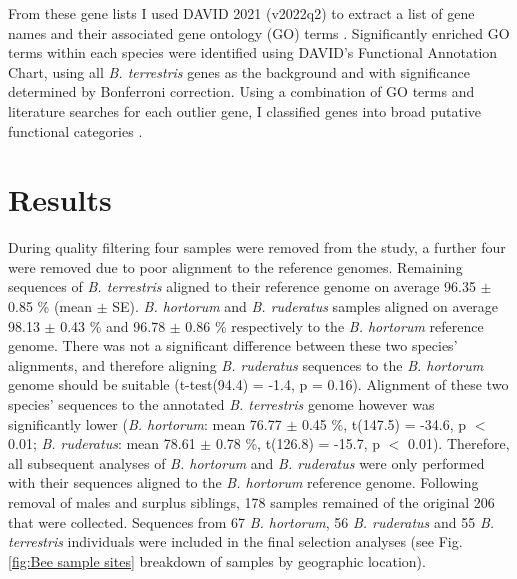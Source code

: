 \documentclass[12pt]{article}
\begin{document}
\begin{linenumbers}
		From these gene lists I used DAVID 2021 (v2022q2) to extract a list of gene names and their associated gene ontology (GO) terms \citep{huang_systematic_2009, sherman_david_2022}. Significantly enriched GO terms within each species were identified using DAVID's Functional Annotation Chart, using all \emph{B. terrestris} genes as the background and with significance determined by Bonferroni correction. Using a combination of GO terms and literature searches for each outlier gene, I classified genes into broad putative functional categories \citep{ashburner_gene_2000, the_gene_ontology_consortium_gene_2021}. 
		
      	
      
    \section{Results}
    
    

	During quality filtering four samples were removed from the study, a further four were removed due to poor alignment to the reference genomes. Remaining sequences of \emph{B. terrestris} aligned to their reference genome on average 96.35 $\pm$ 0.85 \% (mean $\pm$ SE). \emph{B. hortorum} and \emph{B. ruderatus} samples aligned on average 98.13 $\pm$ 0.43 \% and 96.78 $\pm$ 0.86 \% respectively to the \emph{B. hortorum} reference genome. There was not a significant difference between these two species' alignments, and therefore aligning \emph{B. ruderatus} sequences to the \emph{B. hortorum} genome should be suitable (t-test(94.4) = -1.4, p = 0.16). Alignment of these two species' sequences to the annotated \emph{B. terrestris} genome however was significantly lower (\emph{B. hortorum}: mean 76.77 $\pm$ 0.45 \%, t(147.5) = -34.6, p $<$ 0.01; \emph{B. ruderatus}: mean 78.61 $\pm$ 0.78 \%, t(126.8) = -15.7, p $<$ 0.01). Therefore, all subsequent analyses of \emph{B. hortorum} and \emph{B. ruderatus} were only performed with their sequences aligned to the \emph{B. hortorum} reference genome. Following removal of males and surplus siblings, 178 samples remained of the original 206 that were collected. Sequences from 67 \emph{B. hortorum}, 56 \emph{B. ruderatus} and 55 \emph{B. terrestris} individuals were included in the final selection analyses (see Fig. \ref{fig:Bee sample sites} breakdown of samples by geographic location). 
    	

\end{linenumbers}
\end{document}

